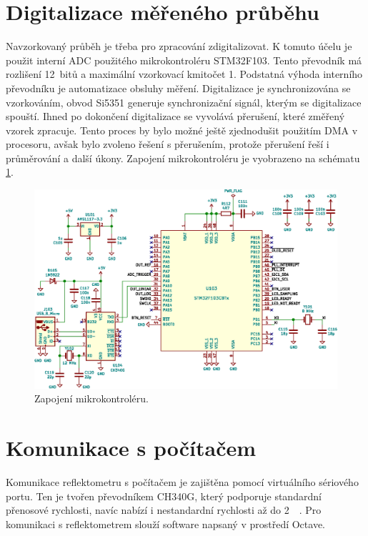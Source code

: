 \section{Digitalizace měřeného průběhu}
Navzorkovaný průběh je třeba pro zpracování zdigitalizovat. K tomuto účelu je použit interní \acrshort{ADC} použitého mikrokontroléru STM32F103. Tento převodník má rozlišení 12~bitů a maximální vzorkovací kmitočet \SI{1}{\megasample}. Podstatná výhoda interního převodníku je automatizace obsluhy měření. Digitalizace je synchronizována se vzorkováním, obvod Si5351 generuje synchronizační signál, kterým se digitalizace spouští. Ihned po dokončení digitalizace se vyvolává přerušení, které změřený vzorek zpracuje. Tento proces by bylo možné ještě zjednodušit použitím DMA v procesoru, avšak bylo zvoleno řešení s přerušením, protože přerušení řeší i průměrování a další úkony. Zapojení mikrokontroléru je vyobrazeno na schématu \ref{microcontroller_section}.

\begin{figure}[htbp]
\includegraphics[width=\textwidth,keepaspectratio]{images/microcontroller_section.eps}\caption{Zapojení mikrokontroléru.}\label{microcontroller_section}
\end{figure}

\section{Komunikace s počítačem}
Komunikace reflektometru s počítačem je zajištěna pomocí virtuálního sériového portu. Ten je tvořen převodníkem CH340G, který podporuje standardní přenosové rychlosti, navíc nabízí i nestandardní rychlosti až do \SI{2}{\mega\baud}. Pro komunikaci s reflektometrem slouží software napsaný v prostředí Octave.

